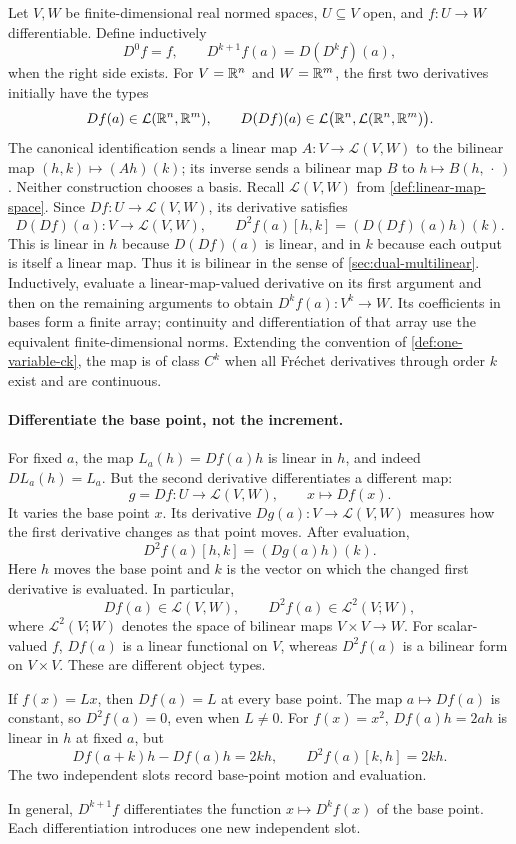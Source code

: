 \begin{definition}\label{def:multivariable-higher-derivatives}
Let $V,W$ be finite-dimensional real normed spaces, $U\subseteq V$ open,
and $f:U\to W$ differentiable. Define inductively
\[
D^0f=f,
\qquad
D^{k+1}f(a)=D(D^kf)(a),
\]
when the right side exists. For $V=\mathbb{R}^n$ and $W=\mathbb{R}^m$, the first two
derivatives initially have the types
\[
Df(a)\in\mathcal L(\mathbb{R}^n,\mathbb{R}^m),\qquad
D(Df)(a)\in\mathcal L\bigl(\mathbb{R}^n,\mathcal L(\mathbb{R}^n,\mathbb{R}^m)\bigr).
\]
The canonical identification sends a linear map $A:V\to\mathcal L(V,W)$
to the bilinear map $(h,k)\mapsto(Ah)(k)$; its inverse sends a bilinear
map $B$ to $h\mapsto B(h,\,\cdot\,)$. Neither construction chooses a basis.
Recall $\mathcal L(V,W)$ from \cref{def:linear-map-space}. Since
$Df:U\to\mathcal L(V,W)$, its derivative satisfies
\[
D(Df)(a):V\to\mathcal L(V,W),\qquad
D^2f(a)[h,k]=(D(Df)(a)h)(k).
\]
This is linear in $h$ because $D(Df)(a)$ is linear, and in $k$ because
each output is itself a linear map. Thus it is bilinear in the sense of
\cref{sec:dual-multilinear}. Inductively, evaluate a linear-map-valued
derivative on its first argument and then on the remaining arguments to
obtain $D^kf(a):V^k\to W$. Its coefficients in bases form a finite array;
continuity and differentiation of that array use the equivalent finite-dimensional norms.  Extending the convention of
\cref{def:one-variable-ck}, the map is of class $C^k$ when all Fr\'echet
derivatives through order $k$ exist and are continuous.
\end{definition}

\paragraph{Differentiate the base point, not the increment.}
For fixed $a$, the map $L_a(h)=Df(a)h$ is linear in $h$, and indeed
$DL_a(h)=L_a$. But the second derivative differentiates a different map:
\[
g=Df:U\to\mathcal L(V,W),\qquad x\longmapsto Df(x).
\]
It varies the base point $x$. Its derivative $Dg(a):V\to\mathcal L(V,W)$
measures how the first derivative changes as that point moves. After evaluation,
\[
D^2f(a)[h,k]=(Dg(a)h)(k).
\]
Here $h$ moves the base point and $k$ is the vector on which the changed
first derivative is evaluated. In particular,
\[
Df(a)\in\mathcal L(V,W),\qquad
D^2f(a)\in\mathcal L^2(V;W),
\]
where $\mathcal L^2(V;W)$ denotes the space of bilinear maps $V\times V\to W$.
For scalar-valued $f$, $Df(a)$ is a linear functional on $V$, whereas
$D^2f(a)$ is a bilinear form on $V\times V$. These are different object types.
\begin{example}
If $f(x)=Lx$, then $Df(a)=L$ at every base point. The map $a\mapsto Df(a)$
is constant, so $D^2f(a)=0$, even when $L\ne0$.
For $f(x)=x^2$, $Df(a)h=2ah$ is linear in $h$ at fixed $a$, but
\[
Df(a+k)h-Df(a)h=2kh,\qquad D^2f(a)[k,h]=2kh.
\]
The two independent slots record base-point motion and evaluation.
\end{example}
In general, $D^{k+1}f$ differentiates the function $x\mapsto D^kf(x)$
of the base point. Each differentiation introduces one new independent slot.

